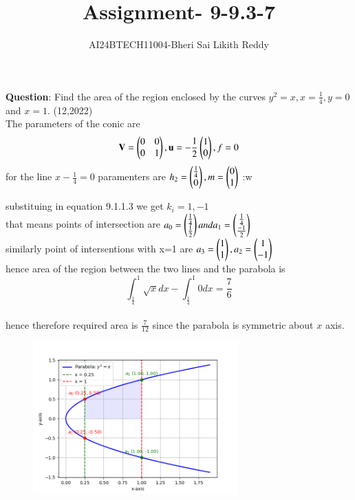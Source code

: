 \documentclass[journal]{IEEEtran}
\begin{document}

\onecolumn
\newpage
\title{Assignment-  9-9.3-7}
\author{AI24BTECH11004-Bheri Sai Likith Reddy}
\maketitle
\textbf{Question}:
Find the area of the region enclosed by the curves $y^2=x, x=\frac{1}{4},y=0 $ and $x=1.$
\hfill{(12,2022)}\\
\solution The parameters of the conic are
$$\mathbf{V}=\begin{pmatrix}0 &0\\0&1\end{pmatrix},\mathbf{u}=-\frac{1}{2}\begin{pmatrix}1\\0\end{pmatrix},f=0$$
for the line $x-\frac{1}{4}=0$ paramenters are $h_2=\begin{pmatrix}\frac{1}{4}\\0\end{pmatrix},m=\begin{pmatrix}0\\1\end{pmatrix}$
:w

substituing in equation 9.1.1.3 we get $k_i=1,-1$\\

that means points of intersection are $a_0=\begin{pmatrix}\frac{1}{4}\\\frac{1}{2}\end{pmatrix}and a_1=\begin{pmatrix}\frac{1}{4}\\\frac{-1}{2}\end{pmatrix}$\\

similarly point of intersentions with x=1 are $a_3=\begin{pmatrix}1\\1\end{pmatrix},a_2=\begin{pmatrix}1\\-1\end{pmatrix}$\\

hence area of the region between the two lines and the parabola is $$\int_{\frac{1}{4}}^1 \sqrt{x} dx-\int_\frac{1}{4}^1 0 dx=\frac{7}{6}$$\\
hence therefore required area is $\frac{7}{12}$ since the parabola is symmetric about $x$ axis.
\begin{table}[h!]
	\centering
	
\end{table}
\begin{figure}[h!]
    \centering
    \includegraphics[width=0.7\textwidth]{figs/figasgn3.png}
\end{figure}
\end{document}
